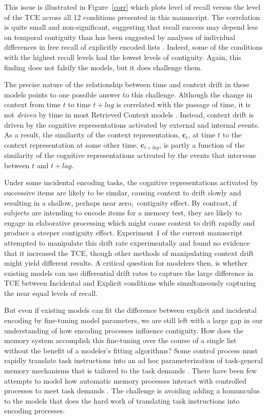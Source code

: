 \documentclass[man,natbib,floatsintext]{apa6} %
\begin{document}
This issue is illustrated in Figure~\ref{corr} which plots level of recall versus the level of the TCE across all 12 conditions presented in this manuscript. The correlation is quite small and non-significant\color{black}, suggesting that recall success may depend less on temporal contiguity than has been suggested by analyses of individual differences in free recall of explicitly encoded lists \citep{SedeEtal10,HealEtal14}. Indeed, some of the conditions with the highest recall levels had the lowest levels of contiguity. Again, this finding does not falsify the models, but it does challenge them.

The precise nature of the relationship between time and context drift in these models points to one possible answer to this challenge. Although the change in context from time $t$ to time $t+lag$ is correlated with the passage of time, it is not \emph{driven} by time in most Retrieved Context models \citep[but see][for a model in which drift is driven by time]{HowaEtal14a}. Instead, context drift is driven by the cognitive representations activated by external and internal events. As a result, the similarity of the context representation, $\mathbf{c}_t$, at time $t$ to the context representation at some other time, $\mathbf{c}_{t+lag}$, is partly a function of the similarity of the cognitive representations activated by the events that intervene between $t$ and $t+lag$. 

Under some incidental encoding tasks, the cognitive representations activated by successive items are likely to be similar, causing context to drift slowly and resulting in a shallow\color{red}, perhaps near zero,\color{black}~contiguity effect. By contrast, if subjects are intending to encode items for a memory test, they are likely to engage in elaborative processing which might cause context to drift rapidly and produce a steeper contiguity effect. Experiment 4 of the current manuscript attempted to manipulate this drift rate experimentally and found no evidence that it increased the TCE, though other methods of manipulating context drift \citep[e.g.,][]{PolyEtal12} might yield different results. A critical question for modelers then, is whether existing models can use differential drift rates to capture the large difference in TCE between Incidental and Explicit conditions while simultaneously capturing the near equal levels of recall.

But even if existing models can fit the difference between explicit and incidental encoding by fine-tuning model parameters, we are still left with a large gap in our understanding of how encoding processes influence contiguity. How does the memory system accomplish this fine-tuning over the course of a single list without the benefit of a modeler's fitting algorithms? Some control process must rapidly translate task instructions into an ad hoc parameterization of task-general memory mechanisms that is tailored to the task demands \citep{HealEtal14,AtkiShif68}. There have been few attempts to model how automatic memory processes interact with controlled processes to meet task demands \citep{LehmMalm13,PolyEtal09}. The challenge is avoiding adding a homunculus to the models that does the hard work of translating task instructions into encoding processes.
\end{document}
